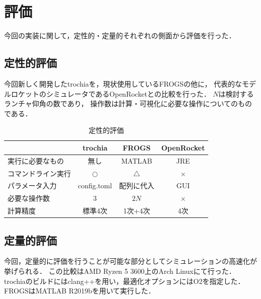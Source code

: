 \documentclass[a4j,10pt]{jsarticle}
\begin{document}


\section{評価}

今回の実装に関して，定性的・定量的それぞれの側面から評価を行った．

\subsection{定性的評価}

今回新しく開発したtrochiaを，現状使用しているFROGSの他に，
代表的なモデルロケットのシミュレータであるOpenRocketとの比較を行った．
$N$は検討するランチャ仰角の数であり，
操作数は計算・可視化に必要な操作についてのものである．

\begin{table}[htbp]
  \hspace*{-2cm}
  \begin{tabular}{|l|c|c|c|} \hline
         & trochia & FROGS & OpenRocket \\ \hline
	実行に必要なもの & 無し & MATLAB & JRE \\
    コマンドライン実行 & $\bigcirc$ & $\bigtriangleup$ & $\times$ \\
    パラメータ入力 & config.toml & 配列に代入 & GUI \\
	必要な操作数 & $3$ & $2N$ & $\times$ \\
	計算精度 & 標準4次 & 1次+4次 & 4次 \\ \hline
  \end{tabular}
  \caption{定性的評価}
\end{table}

\subsection{定量的評価}

今回，定量的に評価を行うことが可能な部分としてシミュレーションの高速化が挙げられる．
この比較はAMD Ryzen 5 3600上のArch Linuxにて行った．
trochiaのビルドにはclang++を用い，最適化オプションにはO2を指定した．
FROGSはMATLAB R2019bを用いて実行した．
\end{document}
